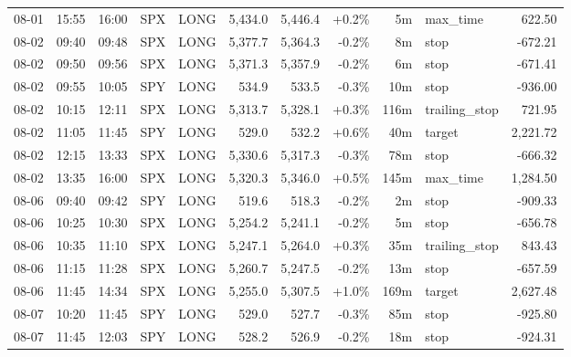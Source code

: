 \documentclass[11pt,a4paper,twoside]{article}
\begin{document}
\begin{center}
\begin{longtable}{>{\color{txtmain}}l l l l l r r r r >{\color{txtmain}}l r}
08-01 & 15:55 & 16:00 & SPX & LONG & 5,434.0 & 5,446.4 & \textcolor{wingreen}{+0.2\%} & 5m & max\_time & \textcolor{wingreen}{622.50} \\
08-02 & 09:40 & 09:48 & SPX & LONG & 5,377.7 & 5,364.3 & \textcolor{lossred}{-0.2\%} & 8m & stop & \textcolor{lossred}{-672.21} \\
08-02 & 09:50 & 09:56 & SPX & LONG & 5,371.3 & 5,357.9 & \textcolor{lossred}{-0.2\%} & 6m & stop & \textcolor{lossred}{-671.41} \\
08-02 & 09:55 & 10:05 & SPY & LONG & 534.9 & 533.5 & \textcolor{lossred}{-0.3\%} & 10m & stop & \textcolor{lossred}{-936.00} \\
08-02 & 10:15 & 12:11 & SPX & LONG & 5,313.7 & 5,328.1 & \textcolor{wingreen}{+0.3\%} & 116m & trailing\_stop & \textcolor{wingreen}{721.95} \\
08-02 & 11:05 & 11:45 & SPY & LONG & 529.0 & 532.2 & \textcolor{wingreen}{+0.6\%} & 40m & target & \textcolor{wingreen}{2,221.72} \\
08-02 & 12:15 & 13:33 & SPX & LONG & 5,330.6 & 5,317.3 & \textcolor{lossred}{-0.3\%} & 78m & stop & \textcolor{lossred}{-666.32} \\
08-02 & 13:35 & 16:00 & SPX & LONG & 5,320.3 & 5,346.0 & \textcolor{wingreen}{+0.5\%} & 145m & max\_time & \textcolor{wingreen}{1,284.50} \\
08-06 & 09:40 & 09:42 & SPY & LONG & 519.6 & 518.3 & \textcolor{lossred}{-0.2\%} & 2m & stop & \textcolor{lossred}{-909.33} \\
08-06 & 10:25 & 10:30 & SPX & LONG & 5,254.2 & 5,241.1 & \textcolor{lossred}{-0.2\%} & 5m & stop & \textcolor{lossred}{-656.78} \\
08-06 & 10:35 & 11:10 & SPX & LONG & 5,247.1 & 5,264.0 & \textcolor{wingreen}{+0.3\%} & 35m & trailing\_stop & \textcolor{wingreen}{843.43} \\
08-06 & 11:15 & 11:28 & SPX & LONG & 5,260.7 & 5,247.5 & \textcolor{lossred}{-0.2\%} & 13m & stop & \textcolor{lossred}{-657.59} \\
08-06 & 11:45 & 14:34 & SPX & LONG & 5,255.0 & 5,307.5 & \textcolor{wingreen}{+1.0\%} & 169m & target & \textcolor{wingreen}{2,627.48} \\
08-07 & 10:20 & 11:45 & SPY & LONG & 529.0 & 527.7 & \textcolor{lossred}{-0.3\%} & 85m & stop & \textcolor{lossred}{-925.80} \\
08-07 & 11:45 & 12:03 & SPY & LONG & 528.2 & 526.9 & \textcolor{lossred}{-0.2\%} & 18m & stop & \textcolor{lossred}{-924.31} \\

\end{longtable}
\end{center}
\end{document}
